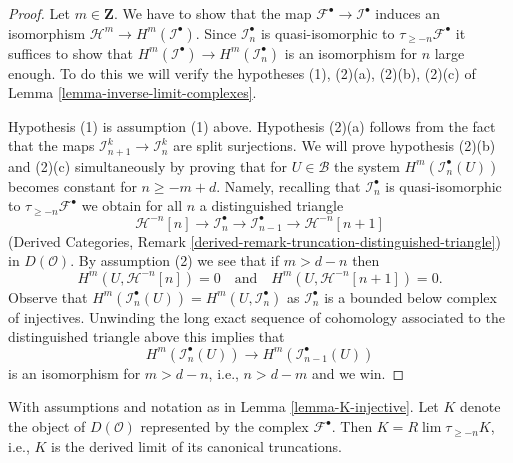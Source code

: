 \begin{proof}
Let $m \in \mathbf{Z}$.
We have to show that the map $\mathcal{F}^\bullet \to \mathcal{I}^\bullet$
induces an isomorphism $\mathcal{H}^m \to H^m(\mathcal{I}^\bullet)$.
Since $\mathcal{I}_n^\bullet$ is quasi-isomorphic to
$\tau_{\geq -n}\mathcal{F}^\bullet$ it suffices to show that
$H^m(\mathcal{I}^\bullet) \to H^m(\mathcal{I}_n^\bullet)$
is an isomorphism for $n$ large enough. To do this we will verify the
hypotheses (1), (2)(a), (2)(b), (2)(c) of
Lemma \ref{lemma-inverse-limit-complexes}.

\medskip\noindent
Hypothesis (1) is assumption (1) above. Hypothesis (2)(a) follows
from the fact that the maps $\mathcal{I}_{n + 1}^k \to \mathcal{I}_n^k$
are split surjections. We will prove hypothesis (2)(b) and (2)(c)
simultaneously by proving that for $U \in \mathcal{B}$ the system
$H^m(\mathcal{I}_n^\bullet(U))$ becomes constant for $n \geq -m + d$.
Namely, recalling that $\mathcal{I}_n^\bullet$ is quasi-isomorphic
to $\tau_{\geq -n}\mathcal{F}^\bullet$ we obtain for all $n$
a distinguished triangle
$$
\mathcal{H}^{-n}[n] \to \mathcal{I}_n^\bullet \to
\mathcal{I}_{n - 1}^\bullet \to \mathcal{H}^{-n}[n + 1]
$$
(Derived Categories, Remark
\ref{derived-remark-truncation-distinguished-triangle})
in $D(\mathcal{O})$. By assumption (2) we see that if $m > d - n$ then
$$
H^m(U, \mathcal{H}^{-n}[n]) = 0
\quad\text{and}\quad
H^m(U, \mathcal{H}^{-n}[n + 1]) = 0.
$$
Observe that $H^m(\mathcal{I}_n^\bullet(U)) = H^m(U, \mathcal{I}_n^\bullet)$
as $\mathcal{I}_n^\bullet$ is a bounded below complex of injectives.
Unwinding the long exact sequence of cohomology associated to the distinguished
triangle above this implies that
$$
H^m(\mathcal{I}_n^\bullet(U)) \to H^m(\mathcal{I}_{n - 1}^\bullet(U))
$$
is an isomorphism for $m > d - n$, i.e., $n > d - m$ and we win.
\end{proof}

\begin{lemma}
\label{lemma-is-limit}
With assumptions and notation as in Lemma \ref{lemma-K-injective}.
Let $K$ denote the object of $D(\mathcal{O})$ represented by
the complex $\mathcal{F}^\bullet$. Then $K = R\lim \tau_{\geq -n} K$, i.e.,
$K$ is the derived limit of its canonical truncations.
\end{lemma}

